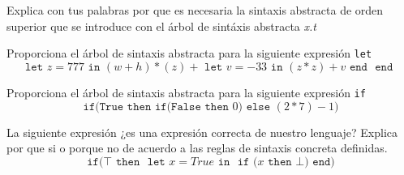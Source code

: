     \bigskip

    \begin{exercise}
        Explica con tus palabras por que es necesaria la sintaxis abstracta de orden superior que se introduce con el árbol de sintáxis abstracta \textit{x.t}
    \end{exercise}

    \bigskip

    \begin{exercise}
        Proporciona el árbol de sintaxis abstracta para la siguiente expresión \texttt{let}
        \[ 
            \texttt{let } z = 777 \texttt{ in } (w + h) * (z) + \texttt{ let } v = -33 \texttt{ in } (z * z) + v \texttt{ end } \texttt{ end } 
        \]
    \end{exercise}

    \bigskip
    
    \begin{exercise}
        Proporciona el árbol de sintaxis abstracta para la siguiente expresión \texttt{if}
        \[
            \texttt{if(} \texttt{True} \texttt{ then } \texttt{if(}  \texttt{False} \texttt{ then } 0) \texttt{ else } (2 * 7) - 1 \texttt{)}
        \]
    \end{exercise}

    \bigskip
    
    \begin{exercise}
        La siguiente expresión ¿es una expresión correcta de nuestro lenguaje? Explica por que si o porque no de acuerdo a las reglas de sintaxis concreta definidas.
        \[
            \texttt{if(} \top \texttt{ then } \texttt{ let } x = True \texttt{ in } \texttt{ if (} x \texttt{ then } \bot \texttt{)} \texttt{ end} \text{)}
        \]
    \end{exercise}

    \bigskip
    
